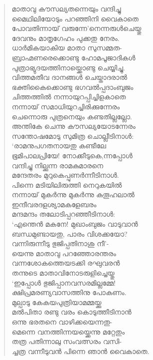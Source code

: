 \begin{verse}
മാതാവു കൗസല്യതന്നെയും വന്ദിച്ചു\\
മൈഥിലിയോടും പറഞ്ഞിനി വൈകാതെ\\
പോവതിന്നായ് വരുന്നേ’നെന്നരുള്‍ചെയ്തു\\
ദേവനും മാതൃഗേഹം പുക്കതു നേരം.\\
ധാര്‍മികയാകിയ മാതാ സുസമ്മത-\\
ബ്രാഹ്മണരെക്കൊണ്ടു ഹോമപൂജാദികള്‍\\
പുത്രാഭ്യുദയത്തിനായ്ക്കൊണ്ടു ചെയ്യിച്ചു.\\
വിത്തമതീവ ദാനങ്ങള്‍ ചെയ്താദരാല്‍\\
ഭക്തികൈക്കൊണ്ടു ഭഗവല്‍പ്പദാംബുജം\\
ചിത്തത്തില്‍ നന്നായുറപ്പിച്ചിളകാതെ\\
നന്നായ് സമാധിയുറച്ചിരിക്കുന്നേരം\\
ചെന്നൊരു പുത്രനെയും കണ്ടതില്ലല്ലോ.\\
അന്തികേ ചെന്നു കൗസല്യയോടന്നേരം\\
സന്തോഷമോടു സുമിത്ര ചൊല്ലീടിനാള്‍:\\
‘രാമനുപഗതനായതു കണ്ടീലേ\\
ഭൂമിപാലപ്രിയേ! നോക്കീടുകെ,ന്നപ്പോള്‍\\
വന്ദിച്ചു നില്ക്കുന്ന രാമകുമാരനെ\\
മന്ദേതരം മുറുകെപ്പുണര്‍ന്നീടിനാള്‍.\\
പിന്നെ മടിയിലിരുത്തി നെറുകയില്‍\\
നന്നായ് മുകര്‍ന്നു മുകര്‍ന്നു കുതൂഹലാല്‍\\
ഇന്ദീവരദളശ്യാമകളേബരം\\
മന്ദമന്ദം തലോടിപ്പറഞ്ഞീടിനാള്‍:\\
‘എന്തെന്‍ മകനേ! മുഖാംബുജം വാടുവാന്‍\\
ബന്ധമുണ്ടായതു, പാരം വിശക്കയോ?\\
വന്നിരുന്നീടു ഭുജിപ്പതിനാശു നീ’-\\
യെന്നു മാതാവു പറഞ്ഞോരന്തരം\\
വന്നശോകത്തെയടക്കി രഘുവരന്‍\\
തന്നുടെ മാതാവിനോടരുളിച്ചെയ്തു\\
‘ഇപ്പോള്‍ ഭുജിപ്പാനവസരമില്ലമ്മേ!\\
ക്ഷിപ്രമരണ്യവാസത്തിനു പോകണം.\\
മുല്പാടു കേകയപുത്രിയാമമ്മയ്ക്കു\\
മല്‍പിതാ രണ്ടു വരം കൊടുത്തീടിനാന്‍\\
ഒന്നു ഭരതനെ വാഴിക്കയെന്നതു-\\
മെന്നെ വനത്തിന്നയയ്ക്കെന്നു മറ്റേതും\\
തത്ര പതിന്നാലു സംവത്സരം വസി-\\
ച്ചത്ര വന്നീടുവന്‍ പിന്നെ ഞാന്‍ വൈകാതെ.\\

\end{verse}
